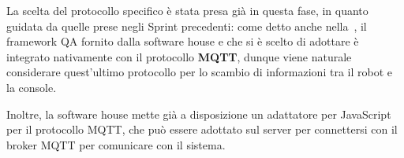 La scelta del protocollo specifico è stata presa già in questa fase, in quanto guidata da quelle prese negli Sprint precedenti:
come detto anche nella~, il framework QA fornito dalla software house e che si è scelto di adottare è integrato nativamente con il protocollo \textbf{MQTT},
dunque viene naturale considerare quest'ultimo protocollo per lo scambio di informazioni tra il robot e la console.

\begin{figure}[H]
  \centering
  \label{fig:sp3:mqtt}
\end{figure}

Inoltre, la software house mette già a disposizione un adattatore per JavaScript per il protocollo MQTT, che può essere adottato sul server per connettersi con il broker MQTT per comunicare con il sistema.
